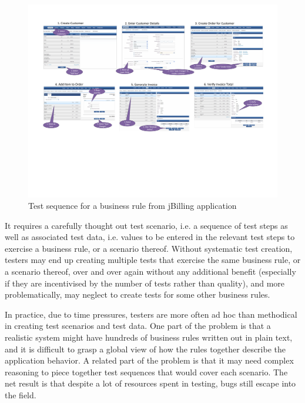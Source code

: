 \begin{figure}
\centering
\includegraphics[trim=0 200 0 50,clip,width=7.5in]{figs/jbilling-flow}
\caption{Test sequence for a business rule from jBilling application}
\label{fig:jbilling-flow}
\end{figure}

It requires a carefully thought out test scenario, i.e. a sequence of test steps as well as associated 
test data, i.e. values to be entered in the relevant test steps to exercise a business rule, or a scenario 
thereof.  Without systematic test creation, testers may end up creating multiple tests that
exercise the same business rule, or a scenario thereof, over and over 
again without any additional benefit (especially if they are incentivised by the number of tests rather than 
quality), and more problematically, may neglect to create tests for some other business rules.

In practice, due to time pressures, testers are more often ad hoc than methodical in creating test 
scenarios and test data.  One part of the problem is that a realistic system might have hundreds of 
business rules written out in plain text, and it is difficult to grasp a global view of how the rules 
together describe the application behavior.  A related part of the problem is that it may need complex 
reasoning to piece together test sequences that would cover each scenario.   The net 
result is that despite a lot of resources spent in testing, bugs still escape into the field.


